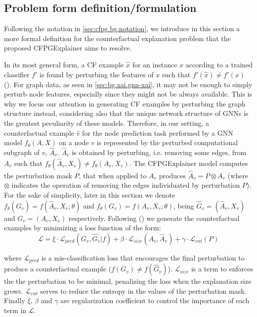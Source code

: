 \documentclass[binding=0.6cm]{sapthesis}
\newcommand{\mycite}[1]{(\cite{#1})}
\begin{document}
\bigskip
\subsection{Problem form definition/formulation}
\label{sec:cfpg.my.form-def}
Following the notation in \cref{sec:cfpg.bg.notation}, we introduce in this section a more formal definition for the counterfactual explanation problem that the proposed CFPGExplainer aims to resolve.

In its most general form, a CF example $\hat{x}$ for an instance $x$ according to a trained classifier $f'$ is found by perturbing the features of $x$ such that $f'(\hat{x}) \ne f'(x)$ (\cite{wachter2018-GDPR}). 
For graph data, as seen in \cref{sec:bg.xai.gnn-xai}, it may not be enough to simply perturb node features, especially since they might not be always available. 
This is why we focus our attention in generating CF examples by perturbing the graph structure instead, considering also that the unique network structure of GNNs is the greatest peculiarity of these models. Therefore, in our setting, a counterfactual example $\hat{v}$ for the node prediction task performed by a GNN model $f_{\theta}(A,X)$ on a node $v$ is represented by the perturbed computational subgraph of $v$, $\hat{A}_v$. 
$\hat{A}_v$ is obtained by perturbing, i.e. removing some edges, from $A_v$ such that $f_{\theta}(\hat{A}_v,X_v) \ne f_{\theta}(A_v,X_v)$. 
The CFPGExplainer model computes the perturbation mask $P$, that when applied to $A_v$ produces $\hat{A}_v = P \otimes A_v$ (where $\otimes$ indicates the operation of removing the edges individuated by perturbation $P$). 
For the sake of simplicity, later in this section we denote $f_{\theta}(\hat{G}_v) = f(\hat{A}_v,X_v;\theta)$ and $f_{\theta}(G_v) = f(A_v,X_v;\theta)$, being $\hat{G}_v = (\hat{A}_v,X_v)$ and $G_v = (A_v,X_v)$ respectively. Following \mycite{lucic2022-cfgnnexplainer} we generate the counterfactual examples by minimizing a loss function of the form: 
\begin{equation}
    \mathcal{L} = \xi \cdot \mathcal{L}_{pred}(G_v,\hat{G}_v|f) + \beta \cdot \mathcal{L}_{size}(A_v,\hat{A}_v) + \gamma \cdot \mathcal{L}_{ent}(P) 
    \label{eq:cfpg.bg.cfpg-loss}
\end{equation}

where $\mathcal{L}_{pred}$ is a mis-classification loss that encourages the final perturbation to produce a counterfactual example ($f(G_v) \ne f(\hat{G}_v)$). $\mathcal{L}_{size}$ is a term to enforces the the perturbation to be minimal, penalizing the loss when the explanation size grows. $\mathcal{L}_{ent}$ serves to reduce the entropy in the values of the perturbation mask. Finally $\xi$, $\beta$ and $\gamma$ are regularization coefficient to control the importance of each term in $\mathcal{L}$.
\end{document}
